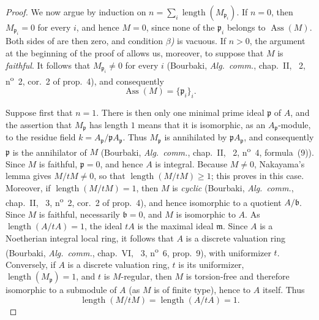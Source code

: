 \begin{proof}
We now argue by induction on $n=\sum_i\operatorname{length}(M_{\mathfrak p_i})$.
If $n=0$, then $M_{\mathfrak p_i}=0$ for every $i$, and hence $M=0$, since none of the $\mathfrak p_i$ belongs to $\operatorname{Ass}(M)$.
Both sides of  are then zero, and condition \emph{$\beta$)} is vacuous.
If $n>0$, the argument at the beginning of the proof of  allows us, moreover, to suppose that $M$ is \emph{faithful}.
It follows that $M_{\mathfrak p_i}\neq 0$ for every $i$ (Bourbaki, \emph{Alg.\ comm.}, chap.~II, \textsection~2, n\textsuperscript{o}~2, cor.~2 of prop.~4), and consequently
\[
\operatorname{Ass}(M)=\{\mathfrak p_i\}_i.
\]


Suppose first that $n=1$.
There is then only one minimal prime ideal $\mathfrak p$ of $A$, and the assertion that $M_{\mathfrak p}$ has length $1$ means that it is isomorphic, as an $A_{\mathfrak p}$-module, to the residue field $k=A_{\mathfrak p}/\mathfrak pA_{\mathfrak p}$.
Thus $M_{\mathfrak p}$ is annihilated by $\mathfrak pA_{\mathfrak p}$, and consequently $\mathfrak p$ is the annihilator of $M$ (Bourbaki, \emph{Alg.\ comm.}, chap.~II, \textsection~2, n\textsuperscript{o}~4, formula~(9)).
Since $M$ is faithful, $\mathfrak p=0$, and hence $A$ is integral.
Because $M\neq 0$, Nakayama's lemma gives $M/tM\neq 0$, so that $\operatorname{length}(M/tM)\geqslant 1$; this proves  in this case.
Moreover, if $\operatorname{length}(M/tM)=1$, then $M$ is \emph{cyclic} (Bourbaki, \emph{Alg.\ comm.}, chap.~II, \textsection~3, n\textsuperscript{o}~2, cor.~2 of prop.~4), and hence isomorphic to a quotient $A/\mathfrak b$.
Since $M$ is faithful, necessarily $\mathfrak b=0$, and $M$ is isomorphic to $A$.
As $\operatorname{length}(A/tA)=1$, the ideal $tA$ is the maximal ideal $\mathfrak m$.
Since $A$ is a Noetherian integral local ring, it follows that $A$ is a discrete valuation ring (Bourbaki, \emph{Alg.\ comm.}, chap.~VI, \textsection~3, n\textsuperscript{o}~6, prop.~9), with uniformizer $t$.
Conversely, if $A$ is a discrete valuation ring, $t$ is its uniformizer, $\operatorname{length}(M_{\mathfrak p})=1$, and $t$ is $M$-regular, then $M$ is torsion-free and therefore isomorphic to a submodule of $A$ (as $M$ is of finite type), hence to $A$ itself.
Thus
\[
\operatorname{length}(M/tM)=\operatorname{length}(A/tA)=1.
\]


\end{proof}
